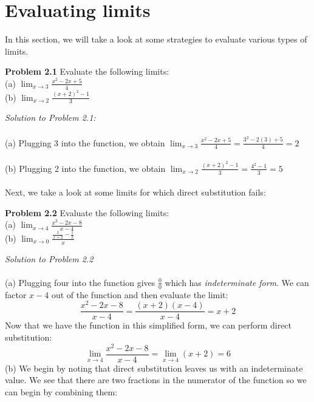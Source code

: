 \documentclass[11pt]{scrartcl}
\begin{document}
\section{Evaluating limits}
\noindent
In this section, we will take a look at some strategies to evaluate various types of limits. 
\begin{tcolorbox}
[colback=purple!5!white,colframe=purple!75!black]
\textbf{Problem 2.1} Evaluate the following limits:\\

(a)   $\lim_{x \to 3} \frac{x^2-2x+5}{4}$\\

(b)   $\lim_{x \to 2} \frac{(x+2)^2-1}{3}$
\end{tcolorbox}
\noindent
\textit{Solution to Problem 2.1:}\\
\noindent
\\
(a)   Plugging 3 into the function, we obtain $\lim_{x \to 3} \frac{x^2-2x+5}{4}=\frac{3^2-2(3)+5}{4}=2$
\\
\\
\noindent 
(b)   Plugging 2 into the function, we obtain $\lim_{x \to 2} \frac{(x+2)^2-1}{3}=\frac{4^2-1}{3}=5$\\
\\
\noindent 
Next, we take a look at some limits for which direct substitution fails:
\\
\begin{tcolorbox}
[colback=purple!5!white,colframe=purple!75!black]
\textbf{Problem 2.2} Evaluate the following limits:\\

(a) $\lim_{x \to 4} \frac{x^2-2x-8}{x-4}$\\

(b) $\lim_{x \to 0} \frac{\frac{1}{x+2}-\frac{1}{2}}{x}$
              
\end{tcolorbox}
\noindent
\textit{Solution to Problem 2.2}\\
\noindent
\\
(a)   Plugging four into the function gives $\frac{0}{0}$ which has \textit{indeterminate form}. We can factor $x-4$
out of the function and then evaluate the limit:
$$\frac{x^2-2x-8}{x-4}=\frac{(x+2)(x-4)}{x-4}=x+2$$
\noindent
Now that we have the function in this simplified form, we can perform direct substitution:
$$\lim_{x \to 4} \frac{x^2-2x-8}{x-4}= \lim_{x \to 4} (x+2)=6$$ 
\noindent
(b) We begin by noting that direct substitution leaves us with an indeterminate value. We see that there are two fractions in the numerator of the function so we can begin by combining them:
\end{document}
